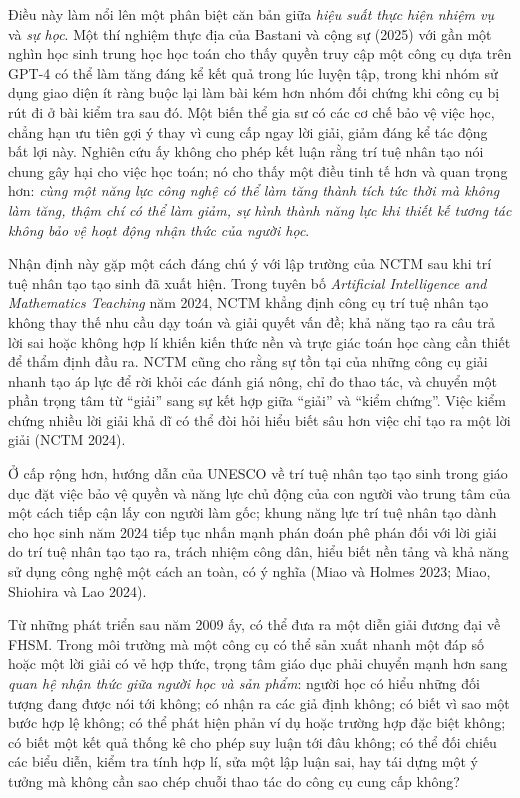 Điều này làm nổi lên một phân biệt căn bản giữa \emph{hiệu suất thực hiện
nhiệm vụ} và \emph{sự học}. Một thí nghiệm thực địa của Bastani và cộng sự
(2025) với gần một nghìn học sinh trung học học toán cho thấy quyền truy cập
một công cụ dựa trên GPT-4 có thể làm tăng đáng kể kết quả trong lúc luyện
tập, trong khi nhóm sử dụng giao diện ít ràng buộc lại làm bài kém hơn nhóm
đối chứng khi công cụ bị rút đi ở bài kiểm tra sau đó. Một biến thể gia sư có
các cơ chế bảo vệ việc học, chẳng hạn ưu tiên gợi ý thay vì cung cấp ngay lời
giải, giảm đáng kể tác động bất lợi này. Nghiên cứu ấy không cho phép kết luận
rằng trí tuệ nhân tạo nói chung gây hại cho việc học toán; nó cho thấy một
điều tinh tế hơn và quan trọng hơn: \emph{cùng một năng lực công nghệ có thể
làm tăng thành tích tức thời mà không làm tăng, thậm chí có thể làm giảm, sự
hình thành năng lực khi thiết kế tương tác không bảo vệ hoạt động nhận thức
của người học}.

Nhận định này gặp một cách đáng chú ý với lập trường của NCTM sau khi trí tuệ
nhân tạo tạo sinh đã xuất hiện. Trong tuyên bố \emph{Artificial Intelligence
and Mathematics Teaching} năm 2024, NCTM khẳng định công cụ trí tuệ nhân tạo
không thay thế nhu cầu dạy toán và giải quyết vấn đề; khả năng tạo ra câu trả
lời sai hoặc không hợp lí khiến kiến thức nền và trực giác toán học càng cần
thiết để thẩm định đầu ra. NCTM cũng cho rằng sự tồn tại của những công cụ giải
nhanh tạo áp lực để rời khỏi các đánh giá nông, chỉ đo thao tác, và chuyển một
phần trọng tâm từ ``giải'' sang sự kết hợp giữa ``giải'' và ``kiểm chứng''.
Việc kiểm chứng nhiều lời giải khả dĩ có thể đòi hỏi hiểu biết sâu hơn việc
chỉ tạo ra một lời giải (NCTM 2024).

Ở cấp rộng hơn, hướng dẫn của UNESCO về trí tuệ nhân tạo tạo sinh trong giáo
dục đặt việc bảo vệ quyền và năng lực chủ động của con người vào trung tâm của
một cách tiếp cận lấy con người làm gốc; khung năng lực trí tuệ nhân tạo dành
cho học sinh năm 2024 tiếp tục nhấn mạnh phán đoán phê phán đối với lời giải
do trí tuệ nhân tạo tạo ra, trách nhiệm công dân, hiểu biết nền tảng và khả
năng sử dụng công nghệ một cách an toàn, có ý nghĩa
(Miao và Holmes 2023; Miao, Shiohira và Lao 2024).

Từ những phát triển sau năm 2009 ấy, có thể đưa ra một diễn giải đương đại về
FHSM. Trong môi trường mà một công cụ có thể sản xuất nhanh một đáp số hoặc
một lời giải có vẻ hợp thức, trọng tâm giáo dục phải chuyển mạnh hơn sang
\emph{quan hệ nhận thức giữa người học và sản phẩm}: người học có hiểu những
đối tượng đang được nói tới không; có nhận ra các giả định không; có biết vì
sao một bước hợp lệ không; có thể phát hiện phản ví dụ hoặc trường hợp đặc
biệt không; có biết một kết quả thống kê cho phép suy luận tới đâu không; có
thể đối chiếu các biểu diễn, kiểm tra tính hợp lí, sửa một lập luận sai, hay
tái dựng một ý tưởng mà không cần sao chép chuỗi thao tác do công cụ cung cấp
không?

